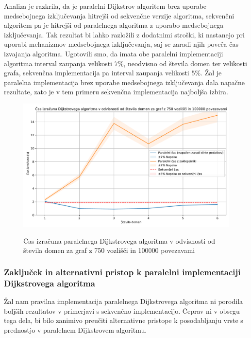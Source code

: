 \documentclass[fin1, tisk]{fmfdelo}
\begin{document}
Analiza je razkrila, da je paralelni Dijkstrov algoritem brez uporabe medsebojnega izključevanja hitrejši od sekvenčne verzije algoritma,
sekvenčni algoritem pa je hitrejši od paralelnega algoritma z uporabo medsebojnega izključevanja. Tak rezultat bi lahko razložili
z dodatnimi stroški, ki nastanejo pri uporabi mehanizmov medsebojnega izključevanja, saj se zaradi njih poveča čas izvajanja algoritma.
Ugotovili smo, da imata obe paralelni implementaciji algoritma interval zaupanja velikosti $7\%$, neodvisno od števila domen ter velikosti grafa, sekvenčna implementacija pa interval zaupanja velikosti $5\%$.
Žal je paralelna implementacija brez uporabe medsebojnega izključevanja dala napačne rezultate, zato je v tem primeru sekvenčna implementacija
najboljša izbira.

\begin{figure}[h!]
  \centering
  \caption{Čas izračuna paralelnega Dijkstrovega algoritma v odvisnosti od števila domen za graf z 750 vozlišči in 100000 povezavami}
  \includegraphics[width=15cm]{slike/dijkstra_v_odvisnosti_od_stevila_domen.pdf}
  \label{fig:dijkstra_calculation_time_by_num_domains}
\end{figure}

\subsubsection{Zaključek in alternativni pristop k paralelni implementaciji Dijkstrovega algoritma}

Žal nam pravilna implementacija paralelnega Dijkstrovega algoritma ni porodila boljših rezultatov v primerjavi s sekvenčno
implementacijo. Čeprav ni v obsegu tega dela, bi bilo zanimivo preučiti alternativne pristope k posodabljanju vrste s prednostjo v paralelnem
Dijkstrovem algoritmu. 
\end{document}
